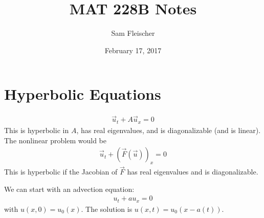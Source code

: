 \documentclass{article}
\title{MAT 228B Notes}
\author{Sam Fleischer}
\date{February 17, 2017}
\begin{document}
    \maketitle

    \section{Hyperbolic Equations}
        \begin{align*}
            \vec{u}_t + A\vec{u}_x = 0
        \end{align*}
        This is hyperbolic in $A$, has real eigenvalues, and is diagonalizable (and is linear).  The nonlinear problem would be
        \begin{align*}
            \vec{u}_t + (\vec{F}(\vec{u}))_x = 0
        \end{align*}
        This is hyperbolic if the Jacobian of $\vec{F}$ has real eigenvalues and is diagonalizable.

        We can start with an advection equation:
        \begin{align*}
            u_t + a u_x = 0
        \end{align*}
        with $u(x,0) = u_0(x)$.  The solution is $u(x,t) = u_0(x - a(t))$.
\end{document}
